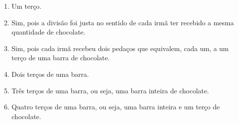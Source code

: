 \begin{solucao}{}{}
\begin{enumerate} [\quad a)] %
    \item  Um terço.
    \item  Sim, pois a divisão foi justa no sentido de cada irmã ter recebido a mesma quantidade de chocolate.
    \item  Sim, pois cada irmã recebeu dois pedaços que equivalem, cada um, a um terço de uma barra de chocolate.
    \item  Dois terços de uma barra.
    \item  Três terços de uma barra, ou seja, uma barra inteira de chocolate.
    \item  Quatro terços de uma barra, ou seja, uma barra inteira e um terço de chocolate.
\end{enumerate} %

\end{solucao}

\newpage

